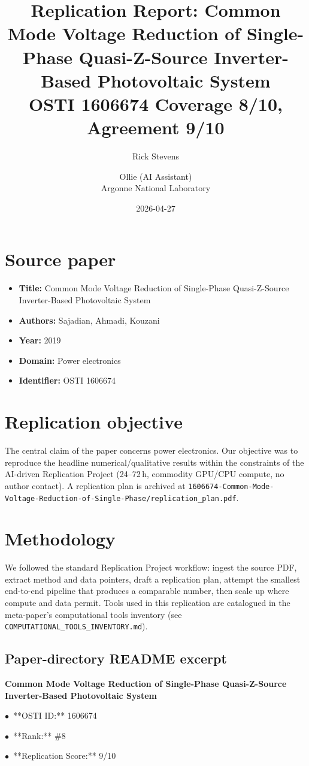 \documentclass[11pt]{article}
\title{Replication Report: Common Mode Voltage Reduction of Single-Phase Quasi-Z-Source Inverter-Based Photovoltaic System\\[2pt]\large OSTI 1606674 \textbar{} Coverage 8/10, Agreement 9/10}
\author{Rick Stevens \and Ollie (AI Assistant)\\\small Argonne National Laboratory}
\date{2026-04-27}
\begin{document}
\maketitle

\section{Source paper}
\begin{itemize}
\item \textbf{Title:} Common Mode Voltage Reduction of Single-Phase Quasi-Z-Source Inverter-Based Photovoltaic System
\item \textbf{Authors:} Sajadian, Ahmadi, Kouzani
\item \textbf{Year:} 2019
\item \textbf{Domain:} Power electronics
\item \textbf{Identifier:} OSTI 1606674
\end{itemize}


\section{Replication objective}
The central claim of the paper concerns power electronics. Our objective was to reproduce the headline numerical/qualitative results within the constraints of the AI-driven Replication Project (24--72\,h, commodity GPU/CPU compute, no author contact). A replication plan is archived at \texttt{1606674-Common-Mode-Voltage-Reduction-of-Single-Phase/replication\_plan.pdf}.

\section{Methodology}
We followed the standard Replication Project workflow: ingest the source PDF, extract method and data pointers, draft a replication plan, attempt the smallest end-to-end pipeline that produces a comparable number, then scale up where compute and data permit. Tools used in this replication are catalogued in the meta-paper's computational tools inventory (see \texttt{COMPUTATIONAL\_TOOLS\_INVENTORY.md}).



\subsection*{Paper-directory README excerpt}
\small
\par\medskip\textbf{Common Mode Voltage Reduction of Single-Phase Quasi-Z-Source Inverter-Based Photovoltaic System}\par
\par$\bullet$\ **OSTI ID:** 1606674
\par$\bullet$\ **Rank:** \#8
\par$\bullet$\ **Replication Score:** 9/10
\end{document}
